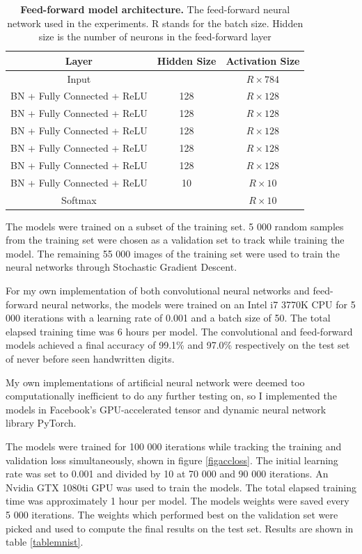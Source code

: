 \documentclass[a4paper, twoside]{article}
\begin{document}
\begin{table}
\begin{center}
    \begin{tabular}{c | c | c }
    Layer & Hidden Size & Activation Size \\ 
    \hline \hline
    Input &  &  $R  \times 784$  \\ 
    BN + Fully Connected + ReLU & 128  & $R \times 128$  \\
    BN + Fully Connected + ReLU & 128  & $R \times 128$  \\
    BN + Fully Connected + ReLU & 128  & $R \times 128$  \\
    BN + Fully Connected + ReLU & 128  & $R \times 128$  \\
    BN + Fully Connected + ReLU & 128  & $R \times 128$  \\
    BN + Fully Connected + ReLU & 10  & $R \times 10$  \\
    Softmax &  &  $R \times 10$  \\
    \end{tabular}\caption{\textbf{Feed-forward model architecture.} The feed-forward neural network used in the experiments. R stands for the batch size. Hidden size is the number of neurons in the feed-forward layer}\label{tabFCC}
\end{center}
\end{table}

The models were trained on a subset of the training set. 5 000 random samples from the training set were chosen as a validation set to track while training the model. The remaining 55 000 images of the training set were used to train the neural networks through Stochastic Gradient Descent.

For my own implementation of both convolutional neural networks and feed-forward neural networks, the models were trained on an Intel i7 3770K CPU for 5 000 iterations with a learning rate of 0.001 and a batch size of 50. The total elapsed training time was 6 hours per model. The convolutional and feed-forward models achieved a final accuracy of 99.1\% and 97.0\% respectively on the test set of never before seen handwritten digits. 

My own implementations of artificial neural network were deemed too computationally inefficient to do any further testing on, so I implemented the models in Facebook's GPU-accelerated tensor and dynamic neural network library PyTorch.

The models were trained for 100 000 iterations while tracking the training and validation loss simultaneously, shown in figure \ref{figaccloss}. The initial learning rate was set to 0.001 and divided by 10 at 70 000 and 90 000 iterations. An Nvidia GTX 1080ti GPU was used to train the models. The total elapsed training time was approximately 1 hour per model. The models weights were saved every 5 000 iterations. The weights which performed best on the validation set were picked and used to compute the final results on the test set. Results are shown in table \ref{tablemnist}.
\end{document}
